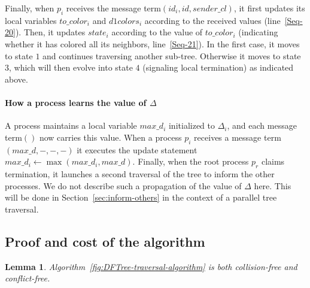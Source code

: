 \documentclass[11pt,english]{article}
\newcommand{\donecol}{\mathit{d1colors}}
\newtheorem{lemma}{Lemma}
\begin{document}
Finally, when $p_i$ receives the message {\sc
  term}$(id_i,id,sender\_cl)$, it first updates its local variables
$to\_color_i$ and $\donecol_i$ according to the received values
(line~\ref{Seq-20}). Then, it updates $state_i$ according to the value
of $to\_color_i$ (indicating whether it has colored all its neighbors,
line~\ref{Seq-21}). In the first case, it moves to state $1$ and
continues traversing another sub-tree. Otherwise it moves to state
$3$, which will then evolve into state $4$ (signaling local
termination) as indicated above.


\paragraph{How a process learns the value of $\Delta$}
A process maintains a local variable $max\_d_i$ initialized to
$\Delta_i$, and each message {\sc term}$()$ now carries this value.
When a process $p_i$ receives a message {\sc term}$(max\_d,-,-,-)$
it executes the update statement $max\_d_i\leftarrow \max(max\_d_i,max\_d)$.  
Finally, when the root process $p_r$ claims termination, it launches a second 
traversal of the tree to inform the other processes.  We do not describe such 
a propagation of the value of $\Delta$ here. This will be done in
Section~\ref{sec:inform-others}  in the context of a parallel tree traversal.



\subsection{Proof and cost of the algorithm}


\begin{lemma}
\label{collision-conflict-freedom}
Algorithm~{\em\ref{fig:DFTree-traversal-algorithm}} is 
both collision-free and conflict-free. 
\end{lemma}
\end{document}
